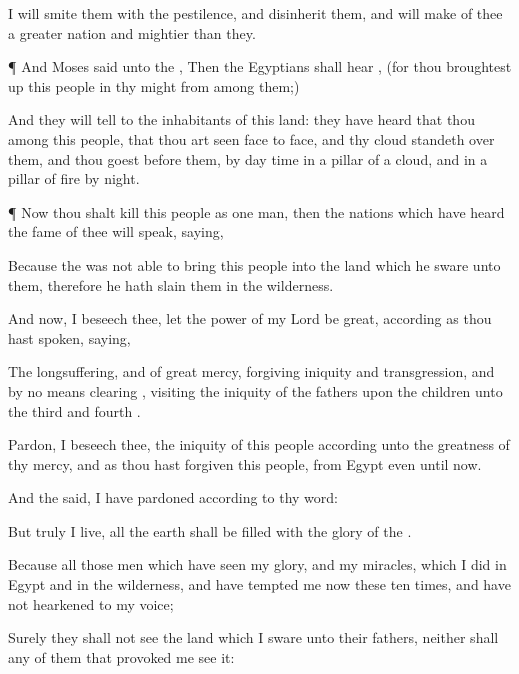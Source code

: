 {I will
smite them with the
pestilence, and
disinherit them, and will
make of thee a
greater
nation and
mightier than they.


\par }{\PP {}¶ And
Moses
said unto the
{}, Then the
Egyptians shall
hear
{}, (for thou broughtest
up this
people in thy
might from
among them;)

And they will
tell
{} to the
inhabitants of this
land:
{} they have
heard that thou
{}
{}
among this
people, that thou
{} art
seen
face to
face, and
{} thy
cloud
standeth over them, and
{} thou
goest
before them, by day
time in a
pillar of a
cloud, and in a
pillar of
fire by
night.


\par }{\PP {}¶ Now
{} thou shalt
kill
{} this
people as
one
man, then the
nations which have
heard the
fame of thee will
speak,
saying,

Because the
{} was
not
able to
bring this
people into the
land which he
sware unto them, therefore he hath
slain them in the
wilderness.

And now, I beseech thee, let the
power of my
Lord be
great,
according as thou hast
spoken,
saying,

The
{}
{}
longsuffering, and of
great
mercy,
forgiving
iniquity and
transgression, and by no
means
clearing
{},
visiting the
iniquity of the
fathers upon the
children unto the
third and
fourth
{}.

Pardon, I beseech thee, the
iniquity of this
people according unto the
greatness of thy
mercy, and as thou hast
forgiven this
people, from
Egypt even until
now.


\par }{\PP {}And the
{}
said, I have
pardoned according to thy
word:

But
{}
truly
{} I
live, all the
earth shall be
filled with the
glory of the
{}.

Because all those
men which have
seen my
glory, and my
miracles, which I
did in
Egypt and in the
wilderness, and have
tempted me now these
ten
times, and have not
hearkened to my
voice;

Surely they shall
not
see the
land which I
sware unto their
fathers, neither shall any of them that
provoked me
see it:

}

